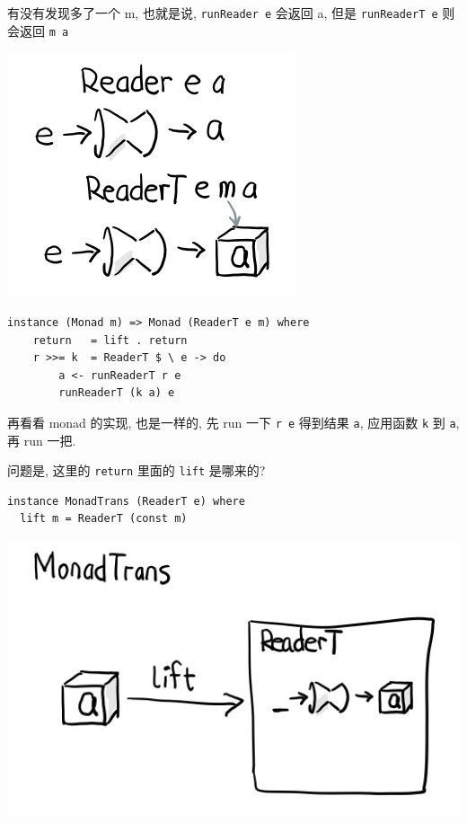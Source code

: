 \documentclass[letterspacing]{tufte-book}
\begin{document}
有没有发现多了一个 m, 也就是说, \texttt{runReader e} 会返回 a, 但是 \texttt{runReaderT e} 则会返回 \texttt{m a}

\begin{center}
\includegraphics[width=.9\linewidth]{images/p3-ReaderT.png}
\end{center}

\lstset{language=haskell,label= ,caption= ,captionpos=b,numbers=none}
\begin{lstlisting}
instance (Monad m) => Monad (ReaderT e m) where
    return   = lift . return
    r >>= k  = ReaderT $ \ e -> do
        a <- runReaderT r e
        runReaderT (k a) e
\end{lstlisting}

再看看 monad 的实现, 也是一样的, 先 run 一下 \texttt{r e} 得到结果 \texttt{a}, 应用函数 \texttt{k} 到 \texttt{a}, 再 run 一把.


问题是, 这里的 \texttt{return} 里面的 \texttt{lift} 是哪来的?

\lstset{language=haskell,label= ,caption= ,captionpos=b,numbers=none}
\begin{lstlisting}
instance MonadTrans (ReaderT e) where
  lift m = ReaderT (const m)
\end{lstlisting}

\begin{center}
\includegraphics[width=.9\linewidth]{images/p3-MonadTrans-ReaderT-e-m.png}
\end{center}
\end{document}
